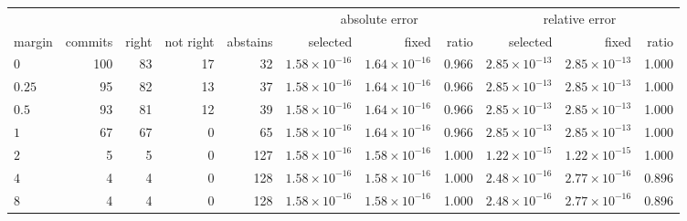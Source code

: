 \begin{tabular}{lrrrr rr rr rr}
\toprule
 & & & & & \multicolumn{3}{c}{absolute error} & \multicolumn{3}{c}{relative error}\\
\cmidrule(lr){6-8}\cmidrule(lr){9-11}
margin & commits & right & not right & abstains & selected & fixed & ratio & selected & fixed & ratio\\
\midrule
$0$ & 100 & 83 & 17 & 32 & $1.58\times10^{-16}$ & $1.64\times10^{-16}$ & 0.966 & $2.85\times10^{-13}$ & $2.85\times10^{-13}$ & 1.000\\
$0.25$ & 95 & 82 & 13 & 37 & $1.58\times10^{-16}$ & $1.64\times10^{-16}$ & 0.966 & $2.85\times10^{-13}$ & $2.85\times10^{-13}$ & 1.000\\
$0.5$ & 93 & 81 & 12 & 39 & $1.58\times10^{-16}$ & $1.64\times10^{-16}$ & 0.966 & $2.85\times10^{-13}$ & $2.85\times10^{-13}$ & 1.000\\
$1$ & 67 & 67 & 0 & 65 & $1.58\times10^{-16}$ & $1.64\times10^{-16}$ & 0.966 & $2.85\times10^{-13}$ & $2.85\times10^{-13}$ & 1.000\\
$2$ & 5 & 5 & 0 & 127 & $1.58\times10^{-16}$ & $1.58\times10^{-16}$ & 1.000 & $1.22\times10^{-15}$ & $1.22\times10^{-15}$ & 1.000\\
$4$ & 4 & 4 & 0 & 128 & $1.58\times10^{-16}$ & $1.58\times10^{-16}$ & 1.000 & $2.48\times10^{-16}$ & $2.77\times10^{-16}$ & 0.896\\
$8$ & 4 & 4 & 0 & 128 & $1.58\times10^{-16}$ & $1.58\times10^{-16}$ & 1.000 & $2.48\times10^{-16}$ & $2.77\times10^{-16}$ & 0.896\\
\bottomrule
\end{tabular}
